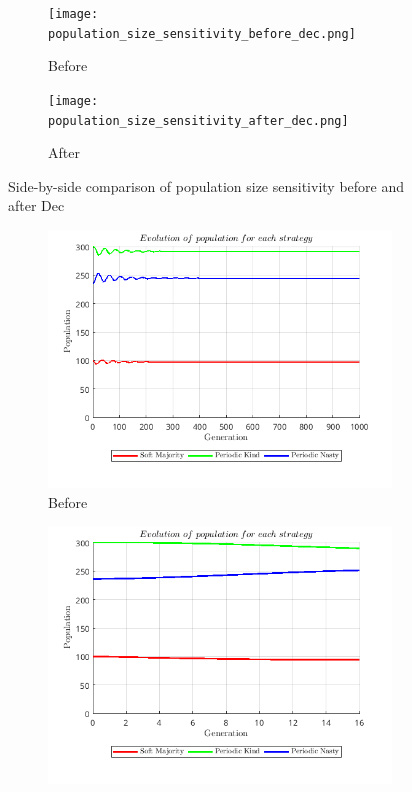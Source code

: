 \documentclass[12pt]{report}
\begin{document}
\begin{figure}[H]
    \centering
    \begin{subfigure}[t]{0.45\textwidth}
        \centering
        \texttt{[image: population\_size\_sensitivity\_before\_dec.png]}
        \caption{Before}
    \end{subfigure}
    \hfill
    \begin{subfigure}[t]{0.45\textwidth}
        \centering
        \texttt{[image: population\_size\_sensitivity\_after\_dec.png]}
        \caption{After}
    \end{subfigure}
    \caption{Side-by-side comparison of population size sensitivity before and after Dec}
\end{figure}
\begin{figure}[H]
    \centering
    \begin{subfigure}[t]{0.45\textwidth}
        \centering
        \includegraphics[width=\textwidth]{population_size_sensitivity_before_off.png}
        \caption{Before}
    \end{subfigure}
    \hfill
    \begin{subfigure}[t]{0.45\textwidth}
        \centering
        \includegraphics[width=\textwidth]{population_size_sensitivity_after_off.png}

\end{subfigure}
\end{figure}
\end{document}
